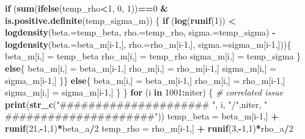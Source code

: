 \documentclass[]{article}
\newenvironment{Shaded}{\begin{snugshade}}{\end{snugshade}}
\newcommand{\CommentTok}[1]{\textcolor[rgb]{0.56,0.35,0.01}{\textit{#1}}}
\newcommand{\ControlFlowTok}[1]{\textcolor[rgb]{0.13,0.29,0.53}{\textbf{#1}}}
\newcommand{\DataTypeTok}[1]{\textcolor[rgb]{0.13,0.29,0.53}{#1}}
\newcommand{\DecValTok}[1]{\textcolor[rgb]{0.00,0.00,0.81}{#1}}
\newcommand{\KeywordTok}[1]{\textcolor[rgb]{0.13,0.29,0.53}{\textbf{#1}}}
\newcommand{\NormalTok}[1]{#1}
\newcommand{\OperatorTok}[1]{\textcolor[rgb]{0.81,0.36,0.00}{\textbf{#1}}}
\newcommand{\StringTok}[1]{\textcolor[rgb]{0.31,0.60,0.02}{#1}}
\begin{document}
\begin{Shaded}
\begin{Highlighting}[]
    \ControlFlowTok{if}\NormalTok{ (}\KeywordTok{sum}\NormalTok{(}\KeywordTok{ifelse}\NormalTok{(temp_rho}\OperatorTok{<}\DecValTok{1}\NormalTok{, }\DecValTok{0}\NormalTok{, }\DecValTok{1}\NormalTok{))}\OperatorTok{==}\DecValTok{0} \OperatorTok{&}\StringTok{ }\KeywordTok{is.positive.definite}\NormalTok{(temp_sigma_m)) \{}
      \ControlFlowTok{if}\NormalTok{ (}\KeywordTok{log}\NormalTok{(}\KeywordTok{runif}\NormalTok{(}\DecValTok{1}\NormalTok{)) }\OperatorTok{<}\StringTok{ }\KeywordTok{logdensity}\NormalTok{(}\DataTypeTok{beta.=}\NormalTok{temp_beta, }\DataTypeTok{rho.=}\NormalTok{temp_rho, }\DataTypeTok{sigma.=}\NormalTok{temp_sigma) }\OperatorTok{-}\StringTok{ }\KeywordTok{logdensity}\NormalTok{(}\DataTypeTok{beta.=}\NormalTok{beta_m[i}\DecValTok{-1}\NormalTok{,], }\DataTypeTok{rho.=}\NormalTok{rho_m[i}\DecValTok{-1}\NormalTok{,], }\DataTypeTok{sigma.=}\NormalTok{sigma_m[i}\DecValTok{-1}\NormalTok{,]))\{}
\NormalTok{        beta_m[i,] =}\StringTok{ }\NormalTok{temp_beta}
\NormalTok{        rho_m[i,] =}\StringTok{ }\NormalTok{temp_rho}
\NormalTok{        sigma_m[i,] =}\StringTok{ }\NormalTok{temp_sigma}
\NormalTok{        \}}
      \ControlFlowTok{else}\NormalTok{\{}
\NormalTok{        beta_m[i,] =}\StringTok{ }\NormalTok{beta_m[i}\DecValTok{-1}\NormalTok{,]}
\NormalTok{        rho_m[i,] =}\StringTok{ }\NormalTok{rho_m[i}\DecValTok{-1}\NormalTok{,]}
\NormalTok{        sigma_m[i,] =}\StringTok{ }\NormalTok{sigma_m[i}\DecValTok{-1}\NormalTok{,]}
\NormalTok{      \}\}}
    \ControlFlowTok{else}\NormalTok{\{}
\NormalTok{      beta_m[i,] =}\StringTok{ }\NormalTok{beta_m[i}\DecValTok{-1}\NormalTok{,]}
\NormalTok{      rho_m[i,] =}\StringTok{ }\NormalTok{rho_m[i}\DecValTok{-1}\NormalTok{,]}
\NormalTok{      sigma_m[i,] =}\StringTok{ }\NormalTok{sigma_m[i}\DecValTok{-1}\NormalTok{,]}
\NormalTok{      \}}
\NormalTok{  \}}
  \ControlFlowTok{for}\NormalTok{ (i }\ControlFlowTok{in} \DecValTok{1001}\OperatorTok{:}\NormalTok{niter) \{   }\CommentTok{# correlated issue}
    \KeywordTok{print}\NormalTok{(}\KeywordTok{str_c}\NormalTok{(}\StringTok{"#####################  "}\NormalTok{, i, }\StringTok{"/"}\NormalTok{,niter, }\StringTok{"  #####################"}\NormalTok{))}
\NormalTok{    temp_beta =}\StringTok{ }\NormalTok{beta_m[i}\DecValTok{-1}\NormalTok{,] }\OperatorTok{+}\StringTok{ }\KeywordTok{runif}\NormalTok{(}\DecValTok{21}\NormalTok{,}\OperatorTok{-}\DecValTok{1}\NormalTok{,}\DecValTok{1}\NormalTok{)}\OperatorTok{*}\NormalTok{beta_a}\OperatorTok{/}\DecValTok{2}
\NormalTok{    temp_rho =}\StringTok{ }\NormalTok{rho_m[i}\DecValTok{-1}\NormalTok{,] }\OperatorTok{+}\StringTok{ }\KeywordTok{runif}\NormalTok{(}\DecValTok{3}\NormalTok{,}\OperatorTok{-}\DecValTok{1}\NormalTok{,}\DecValTok{1}\NormalTok{)}\OperatorTok{*}\NormalTok{rho_a}\OperatorTok{/}\DecValTok{2}

\end{Highlighting}
\end{Shaded}
\end{document}
